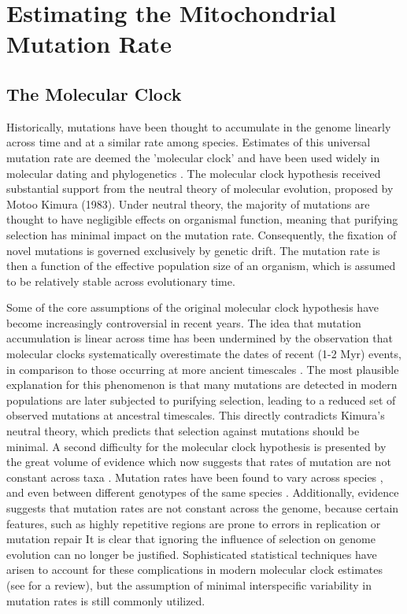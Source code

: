 \documentclass[12pt,twoside]{reedthesis}
\begin{document}
\section{Estimating the Mitochondrial Mutation Rate}
\subsection{The Molecular Clock}
Historically, mutations have been thought to accumulate in the genome linearly across time and at a similar rate among species.
Estimates of this universal mutation rate are deemed the 'molecular clock' \citep{Zuckerkandl_evolutionary_1965} and have been used widely in molecular dating and phylogenetics \citep{hasegawa_dating_1985, mercer_effects_2003, weir_latitudinal_2007}.
The molecular clock hypothesis received substantial support from the neutral theory of molecular evolution, proposed by Motoo Kimura (1983).
Under neutral theory, the majority of mutations are thought to have negligible effects on organismal function, meaning that purifying selection has minimal impact on the mutation rate.
Consequently, the fixation of novel mutations is governed exclusively by genetic drift. 
The mutation rate is then a function of the effective population size of an organism, which is assumed to be relatively stable across evolutionary time.  

Some of the core assumptions of the original molecular clock hypothesis have become increasingly controversial in recent years. 
The idea that mutation accumulation is linear across time has been undermined by the observation that molecular clocks systematically overestimate the dates of recent (1-2 Myr) events, in comparison to those occurring at more ancient timescales \citep{ho_time_2005, ho_molecular_2006}.  
The most plausible explanation for this phenomenon is that many mutations are detected in modern populations are later subjected to purifying selection, leading to a reduced set of observed mutations at ancestral timescales.
This directly contradicts Kimura's neutral theory, which predicts that selection against mutations should be minimal. 
A second difficulty for the molecular clock hypothesis is presented by the great volume of evidence which now suggests that rates of mutation are not constant across taxa \citep{welch_molecular_2005, lynch_evolution_2010}.
Mutation rates have been found to vary across species \citep{baer_mutation_2007,elango_evolutionary_2009, halligan_spontaneous_2009}, and even between different genotypes of the same species \citep{haag-liautard_direct_2007, ness_extensive_2015}.
Additionally, evidence suggests that mutation rates are not constant across the genome, because certain features, such as highly repetitive regions are prone to errors in replication or mutation repair \citep{jeffreys_spontaneous_1988, smith_deterministic_2002, supek_differential_2015}
It is clear that ignoring the influence of selection on genome evolution can no longer be justified.
Sophisticated statistical techniques have arisen to account for these complications in modern molecular clock estimates (see \citealp{ho_molecular-clock_2014} for a review), but the assumption of minimal interspecific variability in mutation rates is still commonly utilized.  
\end{document}
